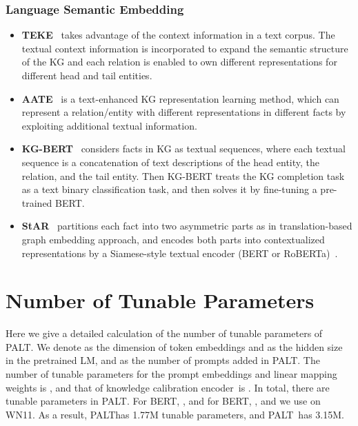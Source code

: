 \documentclass[11pt]{article}
\newcommand{\method}{\textsc{PALT}}
\newcommand{\methodLarge}{\method}
\newcommand{\calibration}{knowledge calibration encoder}
\begin{document}
\subsubsection{Language Semantic Embedding}
\begin{itemize}[leftmargin=*]
\item {\bf TEKE}~\cite{wang_text-enhanced_2016} takes advantage of the context information in a text corpus. The textual context information is incorporated to expand the semantic structure of the KG and each relation is enabled to own different representations for different head and tail entities.

\item {\bf AATE}~\cite{KB_NL_6} is a text-enhanced KG representation learning method, which can represent a relation/entity with different representations in different facts by exploiting additional textual information.

\item {\bf KG-BERT}~\cite{KGBERT} considers facts in KG as textual sequences, where each textual sequence is a concatenation of text descriptions of the head entity, the relation, and the tail entity. Then KG-BERT treats the KG completion task as a text binary classification task, and then solves it by fine-tuning a pre-trained BERT.

\item {\bf StAR}~\cite{wang_structure-augmented_2021} partitions each fact into two asymmetric parts as in translation-based graph embedding approach, and encodes both parts into contextualized representations by a Siamese-style textual encoder (BERT or RoBERTa)~\cite{wang_structure-augmented_2021}.
\end{itemize}

\section{Number of Tunable Parameters}
\label{appendix:param}
Here we give a detailed calculation of the number of tunable parameters of \method. We denote  as the dimension of token embeddings and  as the hidden size in the pretrained LM, and  as the number of prompts added in \method. The number of tunable parameters for the prompt embeddings and linear mapping weights is , and that of \calibration\ is . In total, there are  tunable parameters in \method. For BERT, , and for BERT, , and we use  on WN11. As a result, \method  has 1.77M tunable parameters, and \methodLarge\ has 3.15M.
\end{document}
